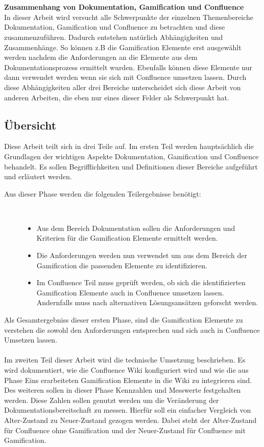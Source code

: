 \documentclass[a4paper,12pt]{scrartcl}
\begin{document}
\\\\
\textbf{Zusammenhang von Dokumentation, Gamification und Confluence}\\
In dieser Arbeit wird versucht alle Schwerpunkte der einzelnen Themenbereiche Dokumentation, Gamification und Confluence zu betrachten und diese zusammenzuführen. Dadurch entstehen natürlich Abhängigkeiten und Zusammenhänge. So können z.B die Gamification Elemente erst ausgewählt werden nachdem die Anforderungen an die Elemente aus dem Dokumentationsprozess ermittelt wurden. Ebenfalls können diese Elemente nur dann verwendet werden wenn sie sich mit Confluence umsetzen lassen. Durch diese Abhängigkeiten aller drei Bereiche unterscheidet sich diese Arbeit von anderen Arbeiten, die eben nur eines dieser Felder als Schwerpunkt hat.
\subsection{Übersicht}
Diese Arbeit teilt sich in drei Teile auf. Im ersten Teil werden hauptsächlich die Grundlagen der wichtigen Aspekte Dokumentation, Gamification und Confluence behandelt. Es sollen Begrifflichkeiten und Definitionen dieser Bereiche aufgeführt und erläutert werden. 
\begin{description}
   \item[Aus dieser Phase werden die folgenden Teilergebnisse benötigt:]~\par
   \begin{itemize}
      \item Aus dem Bereich Dokumentation sollen die Anforderungen und Kriterien für die Gamification Elemente ermittelt werden.
      \item Die Anforderungen werden nun verwendet um aus dem Bereich der Gamification die passenden Elemente zu identifizieren.
      \item Im Confluence Teil muss geprüft werden, ob sich die identifizierten Gamification Elemente auch in Confluence umsetzen lassen. Andernfalls muss nach alternativen Lösungsansätzen geforscht werden.
   \end{itemize}
\end{description}
Als Gesamtergebniss dieser ersten Phase, sind die Gamification Elemente zu verstehen die sowohl den Anforderungen entsprechen und sich auch in Confluence Umsetzen lassen.
\\\\
Im zweiten Teil dieser Arbeit wird die technische Umsetzung beschrieben. Es wird dokumentiert, wie die Confluence Wiki konfiguriert wird und wie die aus Phase Eins erarbeiteten Gamification Elemente in die Wiki zu integrieren sind. Des weiteren sollen in dieser Phase Kennzahlen und Messwerte festgehalten werden. Diese Zahlen sollen genutzt werden um die Veränderung der Dokumentationsbereitschaft zu messen. Hierfür soll ein einfacher Vergleich von Alter-Zustand zu Neuer-Zustand gezogen werden. Dabei steht der Alter-Zustand für Confluence ohne Gamification und der Neuer-Zustand für Confluence mit Gamification.
\end{document}
